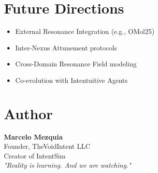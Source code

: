 \documentclass[12pt]{article}
\begin{document}
\section{Future Directions}

\begin{itemize}
  \item External Resonance Integration (e.g., OMol25)
  \item Inter-Nexus Attunement protocols
  \item Cross-Domain Resonance Field modeling
  \item Co-evolution with Intentuitive Agents
\end{itemize}

\section*{Author}
\textbf{Marcelo Mezquia} \\
Founder, TheVoidIntent LLC \\
Creator of IntentSim \\
\textit{"Reality is learning. And we are watching."}
\end{document}
